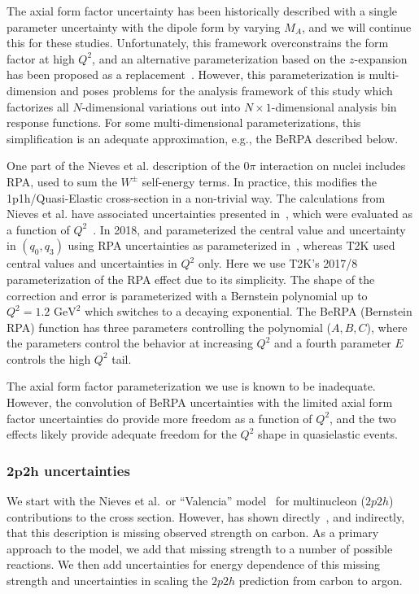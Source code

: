 The axial form factor uncertainty has been historically described with a single parameter uncertainty with the dipole form by varying $M_A$, and we will continue this for these studies.  Unfortunately, this framework overconstrains the form factor at high $Q^2$, and an alternative parameterization based on the $z$-expansion has been proposed as a replacement~\cite{Meyer:2016oeg}.  However, this parameterization is multi-dimension and poses problems for the analysis framework of this study which factorizes all $N$-dimensional variations out into $N\times{}1$-dimensional analysis bin response functions. For some multi-dimensional parameterizations, this simplification is an adequate approximation, e.g., the BeRPA described below. 

One part of the Nieves et al.\cite{Nieves:2011pp,Gran:2013kda} description of the $0\pi$ interaction on nuclei includes RPA, used to sum the $W^\pm$ self-energy terms. In practice, this modifies the 1p1h/Quasi-Elastic cross-section in a non-trivial way. The calculations from Nieves et al. have associated uncertainties presented in~\cite{nieves_uncert}, which were evaluated as a function of $Q^2$~\cite{sanchez-private}. In 2018, \minerva and \nova parameterized the central value and uncertainty in $(q_0, q_3)$ using RPA uncertainties as parameterized in~\cite{RikRPA}, whereas T2K used central values and uncertainties in $Q^2$ only. Here we use T2K's 2017/8 parameterization of the RPA effect\cite{t2k_2018} due to its simplicity. The shape of the correction and error is parameterized with a Bernstein polynomial up to $Q^2=1.2\text{ GeV}^2$ which switches to a decaying exponential. The BeRPA (Bernstein RPA) function has three parameters controlling the polynomial ($A, B, C$), where the parameters control the behavior at increasing $Q^2$ and a fourth parameter $E$ controls the high $Q^2$ tail.

The axial form factor parameterization we use is known to be inadequate.  However, the convolution of BeRPA uncertainties with the limited axial form factor uncertainties do provide more freedom as a function of $Q^2$, and the two effects likely provide adequate freedom for the $Q^2$ shape in quasielastic events.

\subsubsection{$\boldsymbol{2p2h}$ uncertainties}
We start with the Nieves et al.\ or ``Valencia'' model~\cite{nieves1,nieves2} for multinucleon ($2p2h$) contributions to the cross section.  However, \minerva has shown directly~\cite{Rodrigues:2015hik}, and \nova indirectly, that this description is missing observed strength on carbon.  As a primary approach to the model, we add that missing strength to a number of possible reactions.  We then add uncertainties for energy dependence of this missing strength and uncertainties in scaling the $2p2h$ prediction from carbon to argon.


